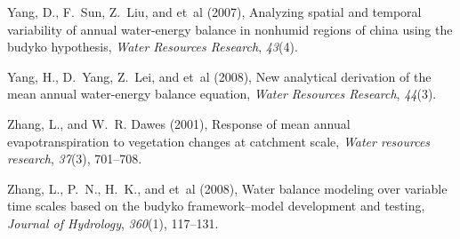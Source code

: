 \documentclass[draft,wrr]{AGUTeX}
\begin{document}
\begin{article}
\begin{thebibliography}{59}
Yang, D., F.~Sun, Z.~Liu, and et~al (2007), Analyzing spatial and temporal
  variability of annual water-energy balance in nonhumid regions of china using
  the budyko hypothesis, \textit{Water Resources Research}, \textit{43}(4).

Yang, H., D.~Yang, Z.~Lei, and et~al (2008), New analytical derivation of the
  mean annual water-energy balance equation, \textit{Water Resources Research},
  \textit{44}(3).

Zhang, L., and W.~R. Dawes (2001), Response of mean annual evapotranspiration
  to vegetation changes at catchment scale, \textit{Water resources research},
  \textit{37}(3), 701--708.

Zhang, L., P.~N., H.~K., and et~al (2008), Water balance modeling over variable
  time scales based on the budyko framework--model development and testing,
  \textit{Journal of Hydrology}, \textit{360}(1), 117--131.

\end{thebibliography}


\end{article}
\end{document}
